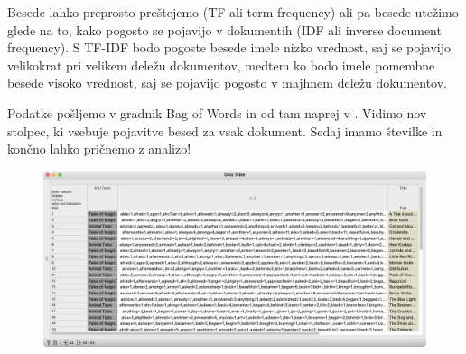 Besede lahko preprosto preštejemo (TF ali term frequency) ali pa besede utežimo glede na to, kako pogosto se pojavijo v dokumentih (IDF ali inverse document frequency). S TF-IDF bodo pogoste besede imele nizko vrednost, saj se pojavijo velikokrat pri velikem deležu dokumentov, medtem ko bodo imele pomembne besede visoko vrednost, saj se pojavijo pogosto v majhnem deležu dokumentov.

Podatke pošljemo v gradnik Bag of Words in od tam naprej v . Vidimo nov stolpec, ki vsebuje pojavitve besed za vsak dokument. Sedaj imamo številke in končno lahko pričnemo z analizo!

\begin{figure}[h]
    \includegraphics[width=\linewidth]{vreca-besed-table.png}%
    \caption{}
    \label{fig:004-vreca-besed-table}
  \end{figure}
